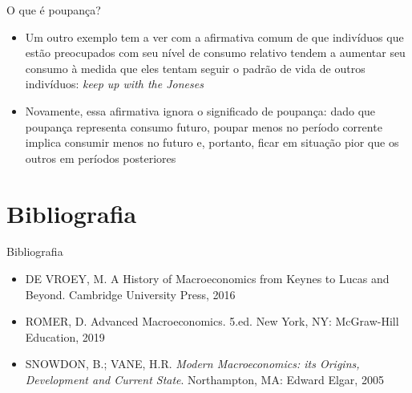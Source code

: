 \documentclass[10pt]{beamer}
\begin{document}
\begin{frame}{O que é poupança?}
    \begin{itemize}
        \item Um outro exemplo tem a ver com a afirmativa comum de que indivíduos que estão preocupados com seu nível de consumo relativo tendem a aumentar seu consumo à medida que eles tentam seguir o padrão de vida de outros indivíduos: \emph{keep up with the Joneses}
        \bigskip
        \item Novamente, essa afirmativa ignora o significado de poupança: dado que poupança representa consumo futuro, poupar menos no período corrente implica consumir menos no futuro e, portanto, ficar em situação pior que os outros em períodos posteriores
    \end{itemize}
\end{frame}

\section{Bibliografia}
\begin{frame}{ Bibliografia}
    \begin{itemize}                        
        \item DE VROEY, M. A History of Macroeconomics from Keynes to Lucas and Beyond. Cambridge University Press, 2016\medskip
        \item ROMER, D. Advanced Macroeconomics. 5.ed. New York, NY: McGraw-Hill Education, 2019\medskip
        \item SNOWDON, B.; VANE, H.R. \emph{Modern Macroeconomics: its Origins, Development and Current State}. Northampton, MA: Edward Elgar, 2005\medskip        
    \end{itemize}
\end{frame}
\end{document}
